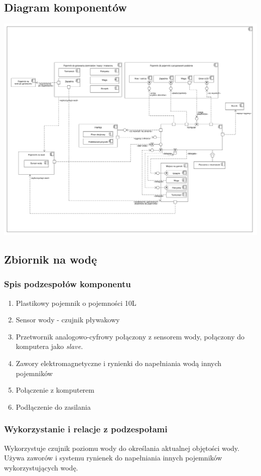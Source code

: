 \documentclass[12pt,a4paper,notitlepage]{article}
\begin{document}
\subsection{Diagram komponentów}
\includegraphics[scale=0.16,width=\textwidth,height=\textheight,keepaspectratio=true]{Diagram_komponentow.pdf}
\newpage

\subsection{Zbiornik na wodę}
\subsubsection{Spis podzespołów komponentu}
\begin{enumerate}
  \item Plastikowy pojemnik o pojemności 10L
  \item Sensor wody - czujnik pływakowy
  \item Przetwornik analogowo-cyfrowy połączony z sensorem wody, połączony do komputera jako \emph{slave}.
  \item Zawory elektromagnetyczne i rynienki do napełniania wodą innych pojemników
  \item Połączenie z komputerem
  \item Podłączenie do zasilania
\end{enumerate}

\subsubsection{Wykorzystanie i relacje z podzespołami}
Wykorzystuje czujnik poziomu wody do określania aktualnej objętości wody. Używa zaworów i systemu rynienek do napełniania innych pojemników wykorzystujących wodę. 
\end{document}
